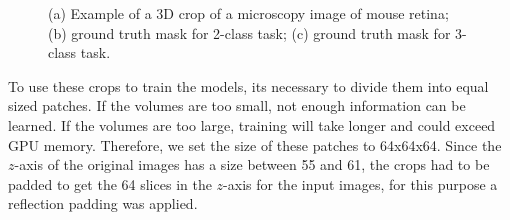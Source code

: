 \begin{figure}[!htb]
	\centering
	\hfil
{}\hfil 
{} 
	\caption[(a) Example of a 3D crop of a microscopy image of mouse retina; (b) ground truth mask for 2-class task; (c) ground truth mask for 3-class task.]{(a) Example of a 3D crop of a microscopy image of mouse retina; (b) ground truth mask for 2-class task; (c) ground truth mask for 3-class task.}
	\label{fig:dataset}
\end{figure}

To use these crops to train the models, its necessary to divide them into equal sized patches. If the volumes are too small, not enough information can be learned. If the volumes are too large, training will take longer and could exceed GPU memory. Therefore, we set the size of these patches to 64x64x64. Since the $z$-axis of the original images has a size between 55 and 61, the crops had to be padded to get the 64 slices in the $z$-axis for the input images, for this purpose a reflection padding was applied.

